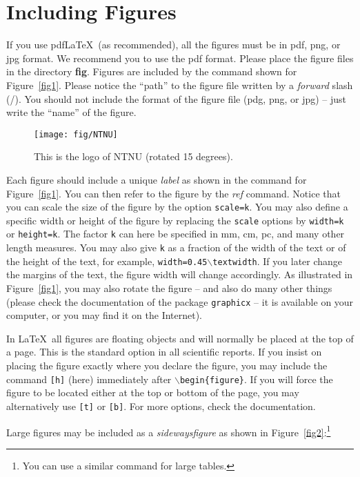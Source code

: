 \section{Including Figures}
If you use pdf\LaTeX\ (as recommended), all the figures must be in pdf, png, or jpg format. We recommend you to use the pdf format.  Please place the figure files in the directory \textbf{fig}. Figures are included by the command shown for Figure~\ref{fig1}. Please notice the ``path'' to the figure file written by a \emph{forward} slash (/). You should not include the format of the figure file (pdg, png, or jpg) -- just write the ``name'' of the figure. 
\begin{figure}
\centering
\texttt{[image: fig/NTNU]}
\caption{This is the logo of NTNU (rotated 15 degrees).}
\label{fig3}
\end{figure}

Each figure should include a unique \emph{label} as shown in the command for Figure~\ref{fig1}. You can then refer to the figure by the \emph{ref} command.
Notice that you can scale the size of the figure by the option \texttt{scale=k}. You may also define a specific width or height of the figure by replacing the \texttt{scale} options by \texttt{width=k} or \texttt{height=k}. The factor \texttt{k} can here be specified in mm, cm, pc, and many other length measures. You may also give \texttt{k} as a fraction of the width of the text or of the height of the text, for example, \texttt{width=0.45$\backslash$textwidth}. If you later change the margins of the text, the figure width will change accordingly. As illustrated in Figure~\ref{fig1}, you may also rotate the figure -- and also do many other things (please check the documentation of the package \texttt{graphicx} -- it is available on your computer, or you may find it on the Internet).

In \LaTeX\ all figures are floating objects and will normally be placed at the top of a page. This is the standard option in all scientific reports. If you insist on placing the figure exactly where you declare the figure, you may include the command \texttt{[h]} (here) immediately after $\backslash$\texttt{begin\{figure\}}. If you will force the figure to be located either at the top or bottom of the page, you may alternatively use  \texttt{[t]} or \texttt{[b]}. For more options, check the documentation.

Large figures may be included as a \emph{sidewaysfigure} as shown in Figure~\ref{fig2}:\footnote{You can use a similar command for large tables.}
\iffalse
\begin{sidewaysfigure}
\centering
\texttt{[image: fig/NTNU]}
\caption{This is the logo of NTNU.}
\label{fig2}
\end{sidewaysfigure}
\fi
